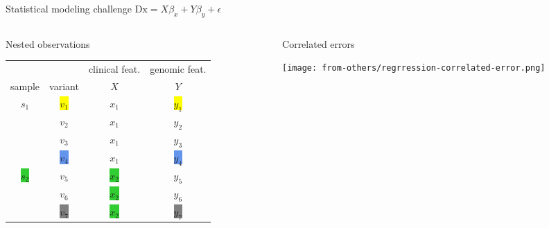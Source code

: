 \documentclass[usenames,dvipsnames]{beamer}
\begin{document}
\begin{frame}{Statistical modeling challenge}
	\(\mathrm{Dx} = X\beta_x + Y\beta_y + \epsilon\)
\footnotesize
\begin{columns}[t]
\begin{column}{0.6\textwidth}
\begin{center}
Nested observations
\end{center}
\begin{center}
\begin{tabular}{cc|c|c}
& & clinical feat. & genomic feat. \\
sample & variant & \(X\) & \(Y\) \\
\hline
\multirow{4}{*}{\colorbox{Apricot}{\(s_1\)}} & \colorbox{Yellow}{\(v_1\)} & \colorbox{Apricot}{\(x_1\)} & \colorbox{Yellow}{\(y_1\)} \\
& \colorbox{Periwinkle}{\(v_2\)} & \colorbox{Apricot}{\(x_1\)} & \colorbox{Periwinkle}{\(y_2\)} \\
& \colorbox{CarnationPink}{\(v_3\)} & \colorbox{Apricot}{\(x_1\)} & \colorbox{CarnationPink}{\(y_3\)} \\
& \colorbox{CornflowerBlue}{\(v_4\)} & \colorbox{Apricot}{\(x_1\)} & \colorbox{CornflowerBlue}{\(y_4\)} \\
\hline
\multirow{3}{*}{{\colorbox{LimeGreen}{\(s_2\)}}} & \colorbox{Dandelion}{\(v_5\)} & \colorbox{LimeGreen}{\(x_2\)} & \colorbox{Dandelion}{\(y_5\)} \\
& \colorbox{Emerald}{\(v_6\)} & \colorbox{LimeGreen}{\(x_2\)} & \colorbox{Emerald}{\(y_6\)} \\
& \colorbox{Gray}{\(v_7\)} & \colorbox{LimeGreen}{\(x_2\)} & \colorbox{Gray}{\(y_7\)} \\
\end{tabular}
\end{center}
\end{column}

\begin{column}{0.4\textwidth}
\begin{center}
Correlated errors
\end{center}
\texttt{[image: from-others/regrression-correlated-error.png]}
\end{column}
\end{columns}
\end{frame}
\end{document}
